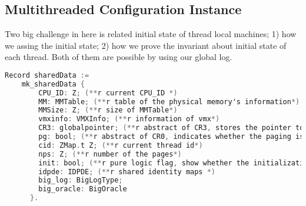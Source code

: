 

\subsection{Multithreaded Configuration Instance}
\label{chapter:certikos:subsec:multithreaded-configuration-instance}

Two big challenge in here is related initial state of thread local machines; 
1) how we assing the initial state; 2) how we prove the invariant about initial state 
of each thread. 
Both of them are possible by using our global log. 

\begin{lstlisting}[language=C]
  Record sharedData :=
    mk_sharedData {
        CPU_ID: Z; (**r current CPU_ID *)
        MM: MMTable; (**r table of the physical memory's information*)
        MMSize: Z; (**r size of MMTable*)
        vmxinfo: VMXInfo; (**r information of vmx*)
        CR3: globalpointer; (**r abstract of CR3, stores the pointer to page table*)
        pg: bool; (**r abstract of CR0, indicates whether the paging is enabled or not*)
        cid: ZMap.t Z; (**r current thread id*)
        nps: Z; (**r number of the pages*)
        init: bool; (**r pure logic flag, show whether the initialization at this layer has been called or not*)
        idpde: IDPDE; (**r shared identity maps *)
        big_log: BigLogType;
        big_oracle: BigOracle
      }.
\end{lstlisting}

